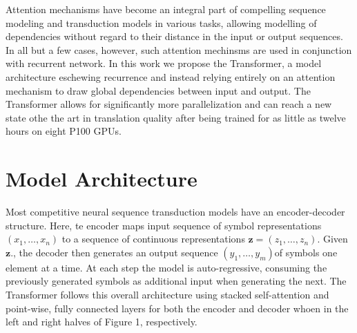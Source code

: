 \documentclass{article}
\begin{document}
Attention mechanisms have become an integral part of compelling sequence modeling and transduction models in various tasks, allowing modelling of dependencies without regard to their distance in the input or output sequences\cite{2,9}.
In all but a few cases\cite{27}, however, such attention mechinsms are used in conjunction with recurrent network.
In this work we propose the Transformer, a model architecture eschewing recurrence and instead relying entirely on  an attention mechanism to draw global dependencies between input and output.
The Transformer allows for significantly more parallelization and can reach a new state othe the art in translation quality after being trained for as little as twelve hours on eight P100 GPUs.

\section{Model Architecture}
Most competitive neural sequence transduction models have an encoder-decoder structure\cite{5,2,35}.
Here, te encoder maps input sequence of symbol representations $\left(x_1,\dots,x_n\right)$  to a sequence of continuous representations $\mathbf{z}=\left(z_1,\dots,z_n\right)$.
Given $\mathbf{z}$., the decoder then generates an output sequence $\left(y_1,\dots,y_m\right)$of symbols one element at a time.
At each step the model is auto-regressive\cite{10}, consuming the previously generated symbols as additional input when generating the next.
The Transformer follows this overall architecture using stacked self-attention and point-wise, fully connected layers for both the encoder and decoder whoen in the left and right halves of Figure 1, respectively.
\end{document}

